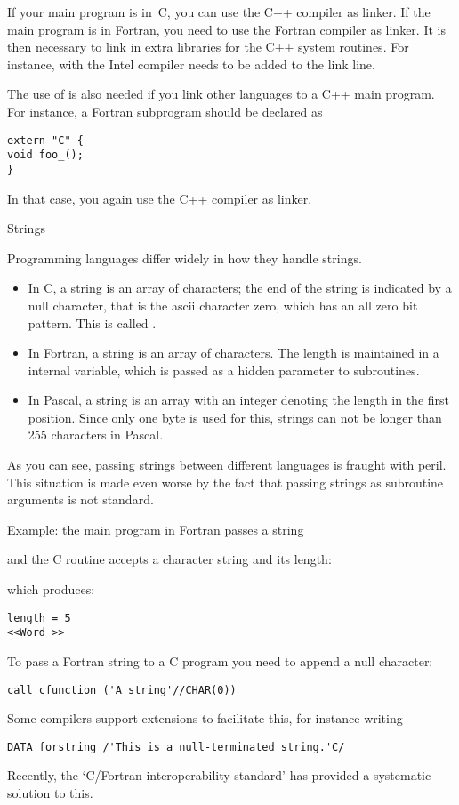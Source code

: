 If your main program is in~C, you can use the C++ compiler as linker.
If the main program is in Fortran, you need to use the Fortran
compiler as linker. It is then necessary to link in extra
libraries for the C++ system routines. For instance, with the 
Intel compiler  needs to be added to the link line.

The use of  is also needed if you link other languages to a
C++ main program. For instance, a Fortran subprogram  should be
declared as
\begin{verbatim}
extern "C" {
void foo_();
}
\end{verbatim}
In that case, you again use the C++ compiler as linker.


 {Strings}

Programming languages differ widely in how they handle strings. 
\begin{itemize}
\item In C, a string is an array of characters; the end of the string
  is indicated by a null character, that is the ascii character zero,
  which has an all zero bit pattern. This is called .
\item In Fortran, a string is an array of characters. The length is
  maintained in a internal variable, which is passed as a hidden
  parameter to subroutines.
\item In Pascal, a string is an array with an integer denoting the
  length in the first position. Since only one byte is used for this,
  strings can not be longer than 255 characters in Pascal.
\end{itemize}
As you can see, passing strings between different languages is fraught
with peril. This situation is made even worse by the fact that passing
strings as subroutine arguments is not standard.

Example: the main program in Fortran passes a string

and the C routine accepts a character string and its length:

which produces:
\begin{verbatim}
length = 5
<<Word >>
\end{verbatim}

To pass a Fortran string to a C program you need to append a null
character:
\begin{verbatim}
call cfunction ('A string'//CHAR(0))
\end{verbatim}
Some compilers support extensions
to facilitate this, for instance writing
\begin{verbatim}
DATA forstring /'This is a null-terminated string.'C/
\end{verbatim}
Recently, the `C/Fortran interoperability standard' has
provided a systematic solution to this.


